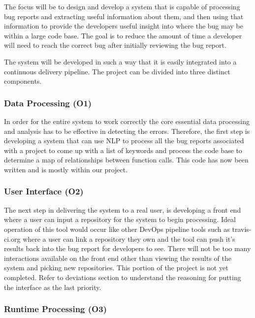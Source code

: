 \documentclass[12pt]{article}
\begin{document}
The focus will be to design and develop a system that is capable of
processing bug reports and extracting useful information about them, and
then using that information to provide the developers useful insight
into where the bug may be within a large code base. The goal is to
reduce the amount of time a developer will need to reach the correct bug
after initially reviewing the bug report.

The system will be developed in such a way that it is easily integrated
into a continuous delivery pipeline. The project can be divided into
three distinct components.

\subsubsection{Data Processing (O1)}\label{data-processing-o1}

In order for the entire system to work correctly the core essential data
processing and analysis has to be effective in detecting the errors.
Therefore, the first step is developing a system that can use NLP to
process all the bug reports associated with a project to come up with a
list of keywords and process the code base to determine a map of
relationships between function calls. This code has now been written and
is mostly within our project.

\subsubsection{User Interface (O2)}\label{user-interface-o2}

The next step in delivering the system to a real user, is developing a
front end where a user can input a repository for the system to begin
processing. Ideal operation of this tool would occur like other DevOps
pipeline tools such as travis-ci.org where a user can link a repository
they own and the tool can push it's results back into the bug report for
developers to see. There will not be too many interactions available on
the front end other than viewing the results of the system and picking
new repositories. This portion of the project is not yet completed.
Refer to deviations section to understand the reasoning for putting the
interface as the last priority.

\subsubsection{Runtime Processing (O3)}\label{runtime-processing-o3}
\end{document}
